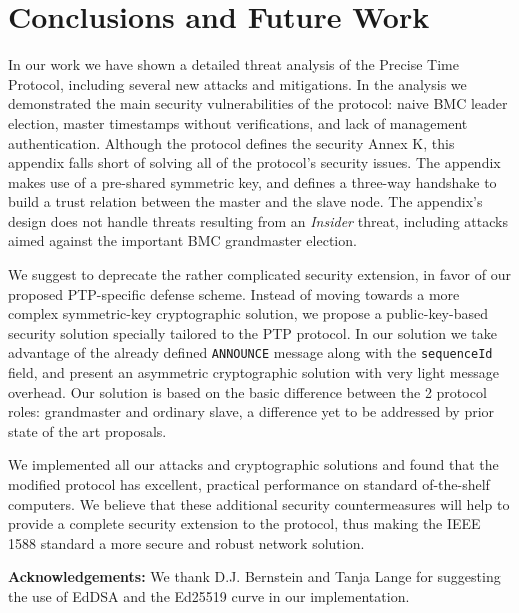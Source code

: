 \documentclass[11pt]{article}
\begin{document}
\section{Conclusions and Future Work}\label{Conclusions}

In our work we have shown a detailed threat analysis of the Precise Time Protocol, including several new attacks and mitigations. In the analysis we demonstrated the main security vulnerabilities of the protocol: naive BMC leader election, master timestamps without verifications, and lack of management authentication. Although the protocol defines the security Annex K, this appendix falls short of solving all of the protocol's security issues. The appendix makes use of a pre-shared symmetric key, and defines a three-way handshake to build a trust relation between the master and the slave node. The appendix's design does not handle threats resulting from an \emph{Insider} threat, including attacks aimed against the important BMC grandmaster election.



We suggest to deprecate the rather complicated security extension, in favor of our proposed PTP-specific defense scheme. Instead of moving towards a more complex symmetric-key cryptographic solution, we propose a public-key-based security solution specially tailored to the PTP protocol. In our solution we take advantage of the already defined \texttt{ANNOUNCE} message along with the \texttt{sequenceId} field, and present an asymmetric cryptographic solution with very light message overhead. Our solution is based on the basic difference between the 2 protocol roles: grandmaster and ordinary slave, a difference yet to be addressed by prior state of the art proposals.



We implemented all our attacks and cryptographic solutions and found that the modified protocol has excellent, practical performance on standard of-the-shelf computers. We believe that these additional security countermeasures will help to provide a complete security extension to the protocol, thus making the IEEE 1588 standard a more secure and robust network solution.







\textbf{Acknowledgements:} We thank D.J. Bernstein and Tanja Lange for suggesting the use of EdDSA and the Ed25519 curve in our implementation.







\newpage



\renewcommand{\theequation}{A-\arabic{equation}}



\setcounter{equation}{0}  

\setcounter{figure}{0}  











{}
\end{document}
